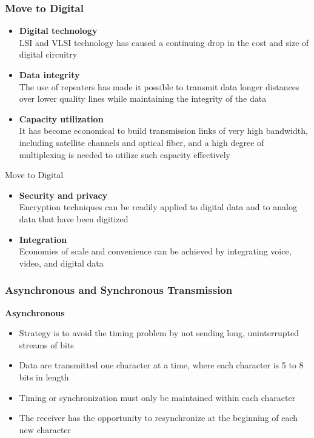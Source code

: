 \documentclass[pdflatex,compress]{beamer}
\begin{document}
\begin{frame}
	\frametitle{Move to Digital}
	\begin{itemize}
		\item \textbf{Digital technology}\\
		LSI and VLSI technology has caused a continuing drop in the cost and size of digital circuitry
		\item \textbf{Data integrity}\\
		The use of repeaters has made it possible to transmit data longer distances over lower quality lines while maintaining the integrity of the data
		\item \textbf{Capacity utilization}\\
		It has become economical to build transmission links of very high bandwidth, including satellite channels and optical fiber, and a high degree of multiplexing is needed to utilize such capacity effectively
	\end{itemize}
\end{frame}

\begin{frame}{Move to Digital}
	\begin{itemize}
		\item \textbf{Security and privacy}\\
		Encryption techniques can be readily applied to digital data and to analog data that have been digitized
		\item \textbf{Integration}\\
		Economies of scale and convenience can be achieved by integrating voice, video, and digital data
	\end{itemize}
\end{frame}

\begin{frame}
	\frametitle{Asynchronous and Synchronous Transmission}
	\textbf{Asynchronous}
	\begin{itemize}
		\item Strategy is to avoid the timing problem by not sending long, uninterrupted streams of bits
		\item Data are transmitted one character at a time, where each character is 5 to 8 bits in length
		\item Timing or synchronization must only be maintained within each character
		\item The receiver has the opportunity to resynchronize at the beginning of each new character
	\end{itemize}
\end{frame}
\end{document}
